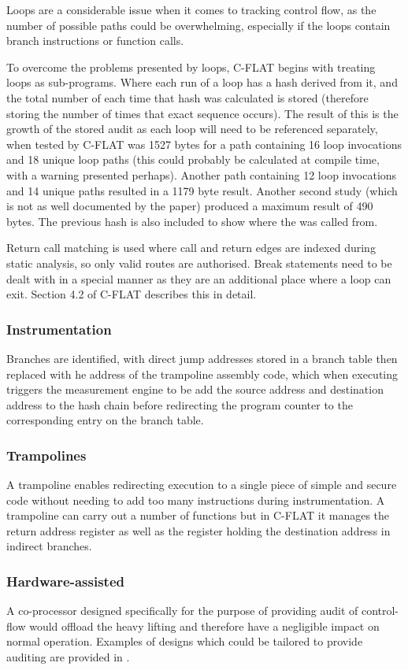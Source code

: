 Loops are a considerable issue when it comes to tracking control flow, as the number of possible paths could be overwhelming, especially if the loops contain branch instructions or function calls.

To overcome the problems presented by loops, C-FLAT \cite{Abera2016} begins with treating loops as sub-programs. Where each run of a loop has a hash derived from it, and the total number of each time that hash was calculated is stored (therefore storing the number of times that exact sequence occurs). The result of this is the growth of the stored audit as each loop will need to be referenced separately, when tested by C-FLAT was 1527 bytes for a path containing 16 loop invocations and 18 unique loop paths (this could probably be calculated at compile time, with a warning presented perhaps). Another path containing 12 loop invocations and 14 unique paths resulted in a 1179 byte result. Another second study (which is not as well documented by the paper) produced a maximum result of 490 bytes. The previous hash is also included to show where the was called from. 

Return call matching is used where call and return edges are indexed during static analysis, so only valid routes are authorised. Break statements need to be dealt with in a special manner as they are an additional place where a loop can exit. Section 4.2 of C-FLAT \cite{Abera2016} describes this in detail.

\subsubsection{Instrumentation}

Branches are identified, with direct jump addresses stored in a branch table then replaced with he address of the trampoline assembly code, which when executing triggers the measurement engine to be add the source address and destination address to the hash chain before redirecting the program counter to the corresponding entry on the branch table.

\subsubsection{Trampolines}

A trampoline enables redirecting execution to a single piece of simple and secure code without needing to add too many instructions during instrumentation. A trampoline can carry out a number of functions but in C-FLAT \cite{Abera2016} it manages the return address register as well as the register holding the destination address in indirect branches. 

\subsubsection{Hardware-assisted}

A co-processor designed specifically for the purpose of providing audit of control-flow would offload the heavy lifting and therefore have a negligible impact on normal operation. Examples of designs which could be tailored to provide auditing are provided in \cite{DeClercq2017}.